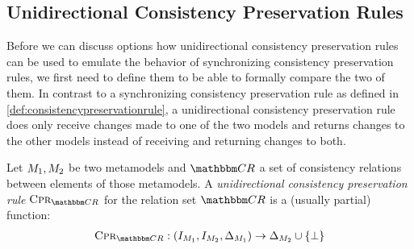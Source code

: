 


\subsection{Unidirectional Consistency Preservation Rules}

Before we can discuss options how unidirectional consistency preservation rules can be used to emulate the behavior of synchronizing consistency preservation rules, we first need to define them to be able to formally compare the two of them.
In contrast to a synchronizing consistency preservation rule as defined in \autoref{def:consistencypreservationrule}, a unidirectional consistency preservation rule does only receive changes made to one of the two models and returns changes to the other models instead of receiving and returning changes to both.

\begin{definition}
    \label{def:unidirectionalconsistencypreservationrule}
    Let $M_{1}, M_{2}$ be two metamodels and $\consistencyrelationset{CR}$ a set of consistency relations between elements of those metamodels.
    A \emph{unidirectional consistency preservation rule} $\consistencypreservationrule{\consistencyrelationset{CR}}$ for the relation set $\consistencyrelationset{CR}$ is a (usually partial) function:
    \begin{align*}
        \consistencypreservationrule{\consistencyrelationset{CR}} : (\metamodelinstanceset{M}{1}, \metamodelinstanceset{M}{2}, \changeuniverse{\metamodel{M}{1}}) \rightarrow \changeuniverse{\metamodel{M}{2}} \cup \setted{\bot}
    \end{align*}
\end{definition}

